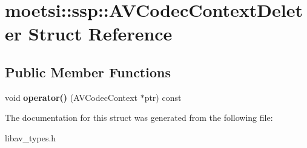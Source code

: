 \hypertarget{structmoetsi_1_1ssp_1_1AVCodecContextDeleter}{}\section{moetsi\+:\+:ssp\+:\+:A\+V\+Codec\+Context\+Deleter Struct Reference}
\label{structmoetsi_1_1ssp_1_1AVCodecContextDeleter}
\subsection*{Public Member Functions}
\begin{DoxyCompactItemize}
\item 
\mbox{\label{structmoetsi_1_1ssp_1_1AVCodecContextDeleter_a0676b07d6baa462eb3b7d61f9e5dbc89}} 
void {\bfseries operator()} (A\+V\+Codec\+Context $\ast$ptr) const
\end{DoxyCompactItemize}


The documentation for this struct was generated from the following file\+:\begin{DoxyCompactItemize}
\item 
libav\+\_\+types.\+h\end{DoxyCompactItemize}
